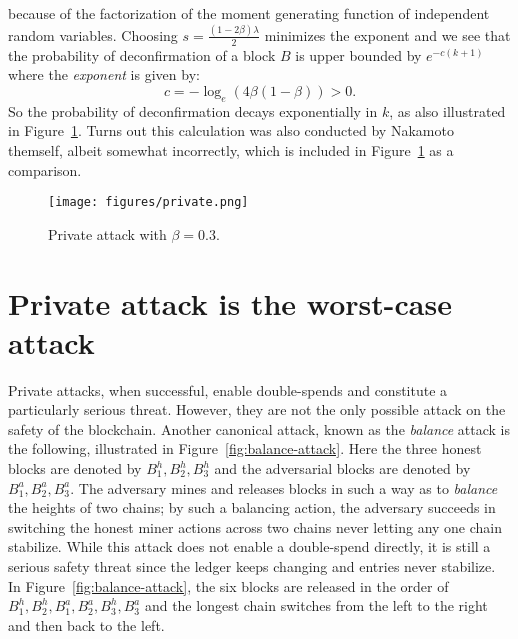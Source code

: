\documentclass{article}
\newcommand{\pramod}[1]{{\color{red}
\footnotesize[Pramod: #1] }}
\newcommand{\xw}[1]{{\color{green}
\footnotesize[Xuechao: #1] }}
\begin{document}
because of the factorization of the moment generating function of independent random variables. %
Choosing $s = \frac{(1-2\beta)\lambda}{2}$ minimizes the exponent and we see that the probability of deconfirmation of a block $B$ is upper bounded by $e^{-c(k+1)}$ where the {\em  exponent} is given by:
$$
c = -\log_e(4\beta(1-\beta)) > 0. 
$$
So the probability of deconfirmation decays exponentially in $k$, as also  illustrated  in Figure~\ref{fig:illustrateprivateattack}. %
Turns out this calculation was also conducted by Nakamoto themself, albeit somewhat incorrectly, which is  included in Figure~\ref{fig:illustrateprivateattack} as a comparison. 

\begin{figure}
    \centering
  \texttt{[image: figures/private.png]}
     \caption{Private attack with $\beta = 0.3$.}
     \label{fig:illustrateprivateattack}
 \end{figure}



\section*{Private attack is the worst-case attack}
Private attacks, when successful, enable double-spends and constitute a particularly serious threat. However, they are not the only possible attack on the safety of the blockchain. Another canonical attack, known as the {\em balance} attack is the following, illustrated in Figure~\ref{fig:balance-attack}. Here the three honest blocks are denoted by $B_1^h, B_2^h, B_3^h$ and the adversarial blocks are denoted by $B_1^a, B_2^a, B_3^a$. The adversary mines and releases blocks in such a way as to {\em balance} the heights of two chains; by such a balancing action, the adversary succeeds in switching the honest miner actions across two chains never letting any one chain stabilize. While this attack does not enable a double-spend directly, it is still a serious safety threat since the ledger keeps changing and entries never stabilize. In Figure~\ref{fig:balance-attack}, the six blocks are released in the order of $B_1^h, B_2^h, B_1^a, B_2^a, B_3^h, B_3^a$ and the longest chain switches from the left to the right and then back to the left.  
\end{document}
